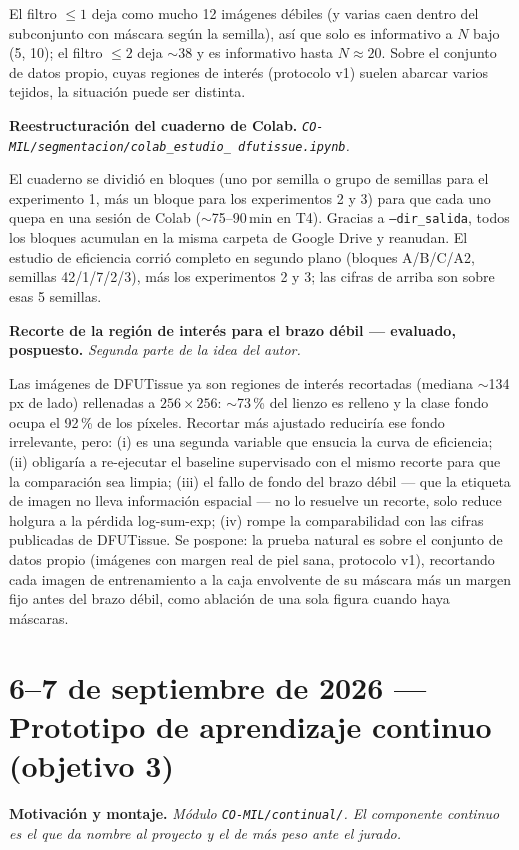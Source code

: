 \documentclass[12pt,letterpaper]{report}
\newcommand{\entrada}[2]{%
    \vspace{0.6em}
    \noindent\textbf{#1.} \textit{#2}
    \vspace{0.3em}
    \par
}
\begin{document}
El filtro $\leq 1$ deja como mucho 12 imágenes débiles (y varias caen dentro del subconjunto con
máscara según la semilla), así que solo es informativo a $N$ bajo (5, 10); el filtro $\leq 2$ deja
$\sim$38 y es informativo hasta $N \approx 20$. Sobre el conjunto de datos propio, cuyas regiones de
interés (protocolo v1) suelen abarcar varios tejidos, la situación puede ser distinta.

\entrada{Reestructuración del cuaderno de Colab}{\texttt{CO-MIL/segmentacion/colab\_estudio\_
dfutissue.ipynb}.}

El cuaderno se dividió en bloques (uno por semilla o grupo de semillas para el experimento 1, más un
bloque para los experimentos 2 y 3) para que cada uno quepa en una sesión de Colab ($\sim$75--90\,min
en T4). Gracias a \texttt{--dir\_salida}, todos los bloques acumulan en la misma carpeta de Google
Drive y reanudan. El estudio de eficiencia corrió completo en segundo plano (bloques A/B/C/A2,
semillas 42/1/7/2/3), más los experimentos 2 y 3; las cifras de arriba son sobre esas 5 semillas.

\entrada{Recorte de la región de interés para el brazo débil --- evaluado, pospuesto}{Segunda parte
de la idea del autor.}

Las imágenes de DFUTissue ya son regiones de interés recortadas (mediana $\sim$134\,px de lado)
rellenadas a $256\times256$: $\sim$73\,\% del lienzo es relleno y la clase fondo ocupa el 92\,\% de
los píxeles. Recortar más ajustado reduciría ese fondo irrelevante, pero: (i) es una segunda
variable que ensucia la curva de eficiencia; (ii) obligaría a re-ejecutar el baseline supervisado
con el mismo recorte para que la comparación sea limpia; (iii) el fallo de fondo del brazo débil
--- que la etiqueta de imagen no lleva información espacial --- no lo resuelve un recorte, solo
reduce holgura a la pérdida log-sum-exp; (iv) rompe la comparabilidad con las cifras publicadas de
DFUTissue. Se pospone: la prueba natural es sobre el conjunto de datos propio (imágenes con margen
real de piel sana, protocolo v1), recortando cada imagen de entrenamiento a la caja envolvente de su
máscara más un margen fijo antes del brazo débil, como ablación de una sola figura cuando haya
máscaras.

\section{6--7 de septiembre de 2026 --- Prototipo de aprendizaje continuo (objetivo 3)}

\entrada{Motivación y montaje}{Módulo \texttt{CO-MIL/continual/}. El componente continuo es el que da
nombre al proyecto y el de más peso ante el jurado.}
\end{document}
